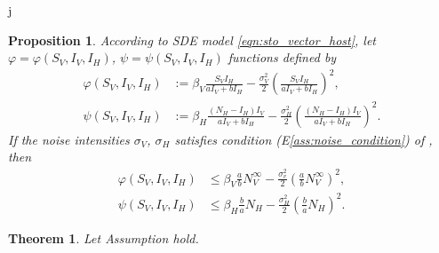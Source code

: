 j\documentclass{amsart}
\theoremstyle{plain}
\newtheorem{theorem}{Theorem}
\newtheorem{proposition}{Proposition}
\theoremstyle{definition}
\begin{document}
        \begin{proposition}
            According to SDE model \eqref{eqn:sto_vector_host},
            let $\varphi = \varphi (S_V, I_V, I_H)$, 
            $\psi = \psi (S_V, I_V, I_H)$ 
            functions defined by
            \begin{equation}
                \begin{aligned}
                    \varphi (S_V, I_V, I_H) &:= 
                        \beta_V \frac{S_V I_H}{a I_V + b I_H}
                        - 
                        \frac{\sigma_V ^ 2}{2} 
                        \left(
                            \frac{S_V I_H}{a I_V + b I_H}
                        \right) ^2,
                    \\
                    \psi (S_V, I_V, I_H) &:=
                    \beta_H \frac{(N_H - I_H)  I_V}{a I_V + b I_H}
                        - 
                        \frac{\sigma_H ^ 2}{2} 
                        \left(
                            \frac{(N_H - I_H)  I_V}{a I_V + b I_H}
                        \right) ^2.
                \end{aligned}
            \end{equation}
            If the noise intensities $\sigma_V$, $\sigma_H$ satisfies condition 
            (E\textendash\ref{ass:noise_condition})
            of , then
            \begin{equation}
                \begin{aligned}
                  \varphi (S_V, I_V, I_H) & \leq \beta_V \frac{a}{b} N_V ^ 
                  {\infty}
                 - \frac{\sigma_v ^ 2}{2}
                  \left(
                          \frac{a}{b} N_V ^ {\infty}
                      \right) ^ 2,
                  \\
                  \psi (S_V, I_V, I_H) & \leq
                      \beta_H \frac{b}{a} N_H - \frac{\sigma_H ^ 2}{2}
                      \left(
                          \frac{b}{a} N_H
                      \right) ^ 2 .
                \end{aligned}
            \end{equation}
        \end{proposition}
%
%
        

%
%
%
%
        \begin{theorem}
            Let Assumption hold.
        \end{theorem}
%
%
\end{document}

